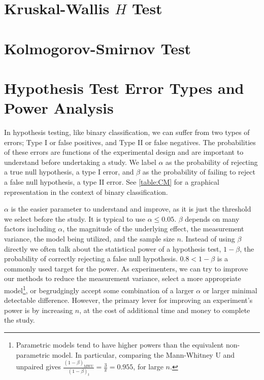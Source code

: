 \section{Kruskal-Wallis \texorpdfstring{$H$}{H} Test}
\label{hypo:kruskal_wallis_H_test}

\section{Kolmogorov-Smirnov Test}
\label{hypo:KS_test}

\section{Hypothesis Test Error Types and Power Analysis}
\label{hypo:power}

In hypothesis testing, like binary classification, we can suffer from two types of errors;
Type I or false positives, and Type II or false negatives.
The probabilities of these errors are functions of the experimental design
and are important to understand before undertaking a study.
We label $\alpha$ as the probability of rejecting a true null hypothesis, \ie a type I error,
and $\beta$ as the probability of failing to reject a false null hypothesis, \ie a type II error.
See \cref{table:CM} for a graphical representation in the context of binary classification.

$\alpha$ is the easier parameter to understand and improve,
as it is just the \pvalue threshold we select before the study.
It is typical to use $\alpha \leq \num{0.05}$.
$\beta$ depends on many factors including
$\alpha$,
the magnitude of the underlying effect,
the measurement variance,
the model being utilized,
and the sample size $n$.
Instead of using $\beta$ directly we often talk about the statistical power of a hypothesis test, $1-\beta$,
\ie the probability of correctly rejecting a false null hypothesis.
$\num{0.8} < 1-\beta$ is a commonly used target for the power.
As experimenters, we can
try to improve our methods to reduce the measurement variance,
select a more appropriate model\footnote{Parametric
models tend to have higher powers than the equivalent non-parametric model.
In particular, comparing
the Mann-Whitney U and unpaired \ttest gives $\frac{\left(1-\beta\right)_{\text{MWU}}}{\left(1-\beta\right)_{t}} = \frac{3}{\pi} = \num{0.955}$,
for large $n$.},
or begrudgingly accept some combination of a larger $\alpha$ or larger minimal detectable difference.
However, the primary lever for improving an experiment's power is by increasing $n$,
at the cost of additional time and money to complete the study.

